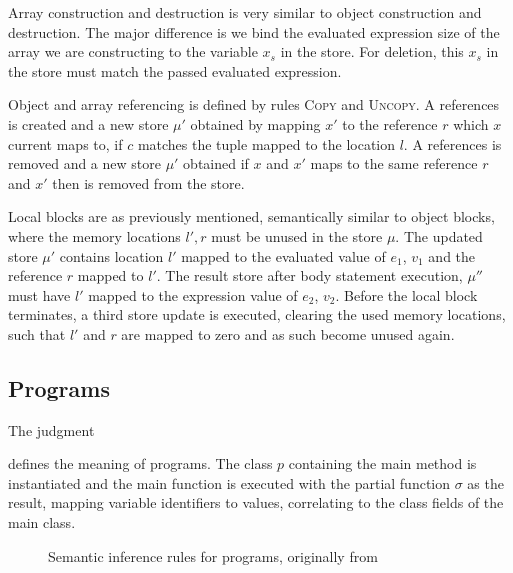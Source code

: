 Array construction and destruction is very similar to object construction and destruction. The major difference is we bind the evaluated expression size of the array we are constructing to the variable $x_s$ in the store. For deletion, this $x_s$ in the store must match the passed evaluated expression.

Object and array referencing is defined by rules \textsc{Copy} and \textsc{Uncopy}. A references is created and a new store $\mu'$ obtained by mapping $x'$ to the reference $r$ which $x$ current maps to, if $c$ matches the tuple mapped to the location $l$. A references is removed and a new store $\mu'$ obtained if $x$ and $x'$ maps to the same reference $r$ and $x'$ then is removed from the store.

Local blocks are as previously mentioned, semantically similar to object blocks, where the memory locations $l', r$ must be unused in the store $\mu$. The updated store $\mu'$ contains location $l'$ mapped to the evaluated value of $e_1$, $v_1$ and the reference $r$ mapped to $l'$. The result store after body statement execution, $\mu''$ must have $l'$ mapped to the expression value of $e_2$, $v_2$. Before the local block terminates, a third store update is executed, clearing the used memory locations, such that $l'$ and $r$ are mapped to zero and as such become unused again.

\subsection{Programs}
\label{subsec:semantics-programs}
The judgment
\begin{prooftree}
\end{prooftree}
defines the meaning of programs. The class $p$ containing the main method is instantiated and the main function is executed with the partial function $\sigma$ as the result, mapping variable identifiers to values, correlating to the class fields of the main class.

\begin{figure}[ht]
    \begin{center}
        
        \DP
        \DP
        \DP
        \DP
        \DP
    \end{center}
    \caption{Semantic inference rules for programs, originally from~\cite{th:roopl}}
    \label{fig:semantics-programs}
\end{figure}

